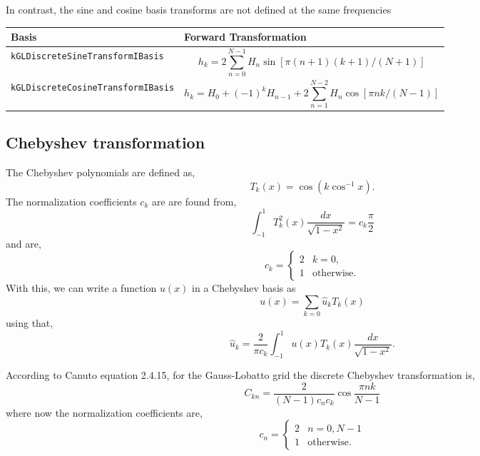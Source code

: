 \documentclass[11pt]{article}
\begin{document}
In contrast, the sine and cosine basis transforms are not defined at the same frequencies

\begin{tabular}{lL}
      \hline
      Basis & Forward Transformation \tabularnewline \hline \hline
      \verb"kGLDiscreteSineTransformIBasis" & \[ h_k = 2 \sum_{n=0}^{N-1} H_n \sin \left[ \pi(n+1)(k+1)/(N+1)\right] \] \tabularnewline
      \verb"kGLDiscreteCosineTransformIBasis" & \[ h_k = H_{0} + (-1)^{k} H_{n-1} +  2 \sum_{n=1}^{N-2} H_n \cos \left[ \pi n k/(N-1)\right] \] \tabularnewline
      \hline
\end{tabular}

\subsection{Chebyshev transformation}
The Chebyshev polynomials are defined as,
\begin{equation}
T_k(x) = \cos{ \left( k \cos^{-1}{x} \right)}.
\end{equation}
The normalization coefficients $c_k$ are are found from,
\begin{equation}
\int_{-1}^{1} T_k^2(x) \frac{dx}{\sqrt{1-x^2}} = c_k \frac{\pi}{2}
\end{equation}
and are,
\begin{equation}
c_k = \begin{cases}
    2  & k=0, \\
    1  & \text{otherwise}.
\end{cases}
\end{equation}
With this, we can write a function $u(x)$ in a Chebyshev basis as
\begin{equation}
u(x) = \sum_{k=0} \hat{u}_k T_k(x)
\end{equation}
using that,
\begin{equation}
\hat{u}_k = \frac{2}{\pi c_k} \int_{-1}^{1} u(x) T_k(x) \frac{dx}{\sqrt{1-x^2}}.
\end{equation}

According to Canuto equation 2.4.15, for the Gauss-Lobatto grid the discrete Chebyshev transformation is,
\begin{equation}
C_{kn} = \frac{2}{(N-1) c_n c_k} \cos \frac{\pi n k}{N-1}
\end{equation}
where now the normalization coefficients are,
\begin{equation}
c_n = \begin{cases}
    2  & n=0, N-1 \\
    1  & \text{otherwise}.
\end{cases}
\end{equation}
\end{document}
